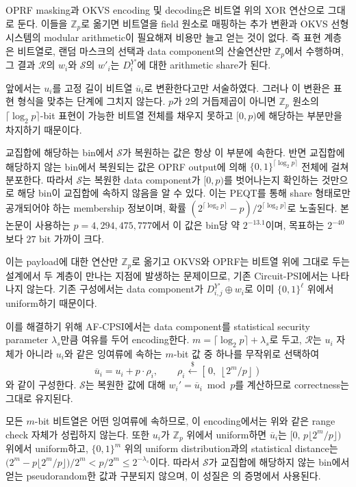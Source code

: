 \documentclass[sigconf,anonymous,review]{acmart}
\newcommand{\Snd}{\mathcal{S}}
\newcommand{\Rcv}{\mathcal{R}}
\newcommand{\Z}{\mathbb{Z}}
\begin{document}
OPRF masking과 OKVS encoding 및 decoding은 비트열 위의 XOR 연산으로 그대로
둔다. 이들을 \(\mathbb{Z}_p\)로 옮기면 비트열을 field 원소로 매핑하는 추가 변환과
OKVS 선형 시스템의 modular arithmetic이 필요해져 비용만 늘고 얻는 것이 없다.
즉 표현 계층은 비트열로, 랜덤 마스크의 선택과 data component의 산술연산만
\(\mathbb{Z}_p\)에서 수행하며, 그 결과 $\mathcal{R}$의 \(w_i\)와 $\mathcal{S}$의
\(w'_i\)는 \(D_i^{Y'}\)에 대한 arithmetic share가 된다.


앞에서는 $u_i$를 고정 길이 비트열 $\overline{u}_i$로 변환한다고만 서술하였다.
그러나 이 변환은 표현 형식을 맞추는 단계에 그치지 않는다. $p$가 $2$의
거듭제곱이 아니면 $\Z_p$ 원소의 $\lceil\log_2 p\rceil$-bit 표현이 가능한
비트열 전체를 채우지 못하고 $[0,p)$에 해당하는 부분만을 차지하기 때문이다.

교집합에 해당하는 bin에서 $\Snd$가 복원하는 값은 항상 이 부분에 속한다.
반면 교집합에 해당하지 않는 bin에서 복원되는 값은 OPRF output에 의해
$\{0,1\}^{\lceil\log_2 p\rceil}$ 전체에 걸쳐 분포한다. 따라서 $\Snd$는
복원한 data component가 $[0,p)$를 벗어나는지 확인하는 것만으로 해당 bin이
교집합에 속하지 않음을 알 수 있다. 이는 PEQT를 통해 share 형태로만
공개되어야 하는 membership 정보이며, 확률
$(2^{\lceil\log_2 p\rceil}-p)/2^{\lceil\log_2 p\rceil}$로 노출된다.
본 논문이 사용하는 $p=4{,}294{,}475{,}777$에서 이 값은 bin당 약 $2^{-13.1}$이며,
목표하는 $2^{-40}$보다 $27$ bit 가까이 크다.

이는 payload에 대한 연산만 $\Z_p$로 옮기고 OKVS와 OPRF는 비트열 위에 그대로
두는 설계에서 두 계층이 만나는 지점에 발생하는 문제이므로, 기존
Circuit-PSI에서는 나타나지 않는다. 기존 구성에서는 data component가
$D_{i,j}^{Y'}\oplus w_i$로 이미 $\{0,1\}^\ell$ 위에서 uniform하기 때문이다.

이를 해결하기 위해 AF-CPSI에서는 data component를 statistical security
parameter $\lambda_s$만큼 여유를 두어 encoding한다.
$m=\lceil\log_2 p\rceil+\lambda_s$로 두고, $\Rcv$는 $u_i$ 자체가 아니라
$u_i$와 같은 잉여류에 속하는 $m$-bit 값 중 하나를 무작위로 선택하여
\begin{equation}\label{eq:redundant-encoding}
\overline{u}_i=u_i+p\cdot\rho_i,
\qquad
\rho_i\xleftarrow{\$}
\left[\,0,\;
\left\lfloor 2^{m}/p \right\rfloor
\right)
\end{equation}
와 같이 구성한다. $\Snd$는 복원한 값에 대해
$w_i'=\overline{u}_i \bmod p$를 계산하므로 correctness는 그대로 유지된다.

모든 $m$-bit 비트열은 어떤 잉여류에 속하므로, 이 encoding에서는 위와 같은
range check 자체가 성립하지 않는다. 또한 $u_i$가 $\Z_p$ 위에서 uniform하면
$\overline{u}_i$는 $[0,\,p\lfloor 2^{m}/p\rfloor)$ 위에서 uniform하고,
$\{0,1\}^{m}$ 위의 uniform distribution과의 statistical distance는
$\bigl(2^{m}-p\lfloor 2^{m}/p\rfloor\bigr)/2^{m}<p/2^{m}\le 2^{-\lambda_s}$이다.
따라서 $\Snd$가 교집합에 해당하지 않는 bin에서 얻는 pseudorandom한 값과
구분되지 않으며, 이 성질은 의 증명에서 사용된다.
\end{document}
